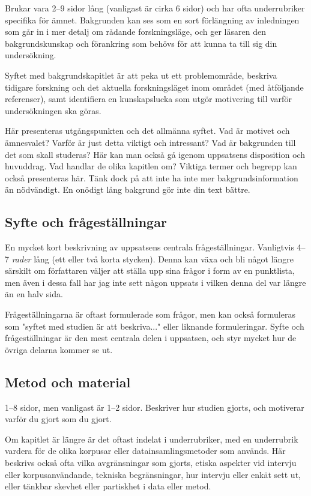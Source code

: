 Brukar vara 2--9 sidor lång (vanligast är cirka 6 sidor) och har ofta
underrubriker specifika för ämnet. Bakgrunden kan ses som en sort förlängning
av inledningen som går in i mer detalj om rådande forskningsläge, och ger
läsaren den bakgrundskunskap och förankring som behövs för att kunna ta till
sig din undersökning.

Syftet med bakgrundskapitlet är att peka ut ett problemområde, beskriva
tidigare forskning och det aktuella forskningsläget inom området (med
åtföljande referenser), samt identifiera en kunskapslucka som utgör motivering
till varför undersökningen ska göras.

Här presenteras utgångspunkten och det allmänna syftet. Vad är motivet och
ämnesvalet? Varför är just detta viktigt och intressant? Vad är bakgrunden till
det som skall studeras? Här kan man också gå igenom uppsatsens disposition och
huvuddrag. Vad handlar de olika kapitlen om? Viktiga termer och begrepp kan
också presenteras här. Tänk dock på att inte ha inte mer bakgrundsinformation
än nödvändigt. En onödigt lång bakgrund gör inte din text bättre.


\subsection{Syfte och frågeställningar}
\label{rubrik.syfte}

En mycket kort beskrivning av uppsatsens centrala frågeställningar. Vanligtvis
4–7 \emph{rader} lång (ett eller två korta stycken). Denna kan växa och bli
något längre särskilt om författaren väljer att ställa upp sina frågor i form
av en punktlista, men även i dessa fall har jag inte sett någon uppsats i
vilken denna del var längre än en halv sida.

Frågeställningarna är oftast formulerade som frågor, men kan också formuleras
som "syftet med studien är att beskriva..." eller liknande formuleringar. Syfte
och frågeställningar är den mest centrala delen i uppsatsen, och styr mycket
hur de övriga delarna kommer se ut.


\subsection{Metod och material}
\label{rubrik.metod}

1--8 sidor, men vanligast är 1--2 sidor. Beskriver hur studien gjorts, och
motiverar varför du gjort som du gjort.

Om kapitlet är längre är det oftast indelat i underrubriker, med en underrubrik
vardera för de olika korpusar eller datainsamlingsmetoder som används. Här
beskrivs också ofta vilka avgränsningar som gjorts, etiska aspekter vid
intervju eller korpusanvändande, tekniska begränsningar, hur intervju eller
enkät sett ut, eller tänkbar skevhet eller partiskhet i data eller metod.


